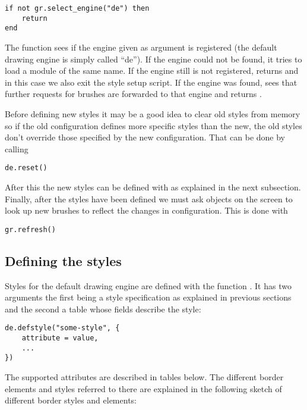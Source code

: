 \begin{verbatim}
if not gr.select_engine("de") then 
    return 
end
\end{verbatim}

The  function sees if the engine
given as argument is registered (the default drawing engine is
simply called ``de''). If the engine could not be found, it
tries to load a module of the same name. If the engine still
is not registered,  returns 
and in this case we also exit the style setup script.
If the engine was found,  sees that
further requests for brushes are forwarded to that engine
and returns .

Before defining new styles it may be a good idea to clear old
styles from memory so if the old configuration defines more
specific styles than the new, the old styles don't override 
those specified by the new configuration. That can be done by
calling

\begin{verbatim}
de.reset()
\end{verbatim}

After this the new styles can be defined with 
as explained in the next subsection. Finally, after the styles have
been defined we must ask objects on the screen to look up new brushes
to reflect the changes in configuration. This is done with

\begin{verbatim}
gr.refresh()
\end{verbatim}

\subsection{Defining the styles}

Styles for the default drawing engine are defined with the
function . It has two arguments the first being
a style specification as explained in previous sections and the second
a table whose fields describe the style:

\begin{verbatim}
de.defstyle("some-style", {
    attribute = value,
    ...
})
\end{verbatim}

The supported attributes are described in tables below. The different
border elements and styles referred to there are explained in the following
sketch of different border styles and elements:

